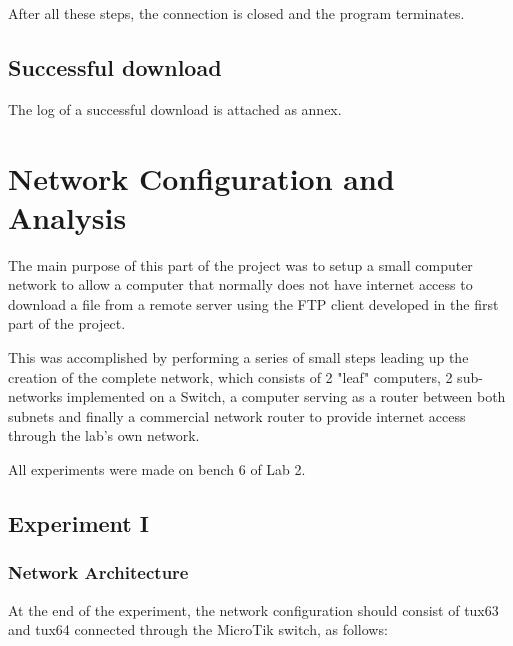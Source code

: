 \documentclass[11pt,a4paper,twocolumn]{article}
\begin{document}
After all these steps, the connection is closed and the program terminates.

\subsection{Successful download}

The log of a successful download is attached as annex.

\section{Network Configuration and Analysis}

The main purpose of this part of the project was to setup a small computer network to allow a computer that normally does not have internet access to download a file from a remote server using the FTP client developed in the first part of the project.

This was accomplished by performing a series of small steps leading up the creation of the complete network, which consists of 2 "leaf" computers, 2 sub-networks implemented on a Switch, a  computer serving as a router between both subnets and finally a commercial network router to provide internet access through the lab's own network.

All experiments were made on bench 6 of Lab 2.

\subsection{Experiment I}

\subsubsection{Network Architecture}

At the end of the experiment, the network configuration should consist of tux63 and tux64 connected through the MicroTik switch, as follows:
\end{document}
